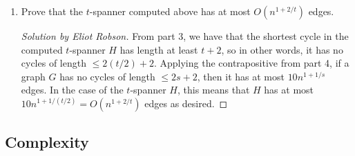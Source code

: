 \documentclass{article}
\newenvironment{solution}[1]{\begin{proof}[Solution by #1]}{\end{proof}}
\begin{document}
\begin{enumerate}
    \item Prove that the \(t\)-spanner computed above has at most \(O(n^{1 + 2/t})\) edges.
    
    \begin{solution}{Eliot Robson}
        From part 3, we have that the shortest cycle in the computed \(t\)-spanner \(H\) has length at least \(t + 2\), so in other words, it has no cycles of length \(\leq 2(t/2) + 2\). Applying the contrapositive from part 4, if a graph \(G\) has no cycles of length \(\leq 2s + 2\), then it has at most \(10n^{1 + 1/s}\) edges. In the case of the \(t\)-spanner \(H\), this means that \(H\) has at most \(10 n^{1 + 1/(t/2)} = O(n^{1 + 2/t})\) edges as desired.
    \end{solution}
\end{enumerate}

\subsection{Complexity}
\end{document}

